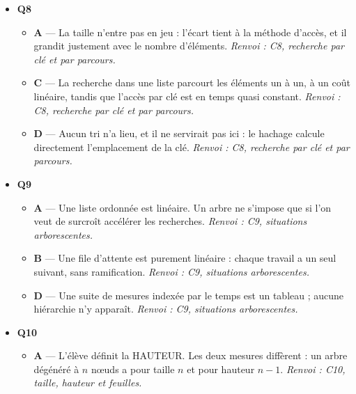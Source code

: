 \begin{itemize}
\begin{itemize}
    \item \textbf{B} — L'arbre de recherche organise les données par valeur. Ici, c'est l'ordre de visite qui compte, non un ordre sur les adresses. \emph{Renvoi : C7, choix d'une structure.}
    \item \textbf{C} — Une file rendrait d'abord la page la PLUS ANCIENNE, alors que le retour arrière doit rendre la plus récente. \emph{Renvoi : C7, choix d'une structure.}
    \item \textbf{D} — La matrice d'adjacence décrit des liens entre sommets ; elle ne mémorise aucune chronologie. \emph{Renvoi : C7, choix d'une structure.}
  \end{itemize}
  \item \textbf{Q8}
  \begin{itemize}
    \item \textbf{A} — La taille n'entre pas en jeu : l'écart tient à la méthode d'accès, et il grandit justement avec le nombre d'éléments. \emph{Renvoi : C8, recherche par clé et par parcours.}
    \item \textbf{C} — La recherche dans une liste parcourt les éléments un à un, à un coût linéaire, tandis que l'accès par clé est en temps quasi constant. \emph{Renvoi : C8, recherche par clé et par parcours.}
    \item \textbf{D} — Aucun tri n'a lieu, et il ne servirait pas ici : le hachage calcule directement l'emplacement de la clé. \emph{Renvoi : C8, recherche par clé et par parcours.}
  \end{itemize}
  \item \textbf{Q9}
  \begin{itemize}
    \item \textbf{A} — Une liste ordonnée est linéaire. Un arbre ne s'impose que si l'on veut de surcroît accélérer les recherches. \emph{Renvoi : C9, situations arborescentes.}
    \item \textbf{B} — Une file d'attente est purement linéaire : chaque travail a un seul suivant, sans ramification. \emph{Renvoi : C9, situations arborescentes.}
    \item \textbf{D} — Une suite de mesures indexée par le temps est un tableau ; aucune hiérarchie n'y apparaît. \emph{Renvoi : C9, situations arborescentes.}
  \end{itemize}
  \item \textbf{Q10}
  \begin{itemize}
    \item \textbf{A} — L'élève définit la HAUTEUR. Les deux mesures diffèrent : un arbre dégénéré à $n$ nœuds a pour taille $n$ et pour hauteur $n-1$. \emph{Renvoi : C10, taille, hauteur et feuilles.}

\end{itemize}
\end{itemize}
